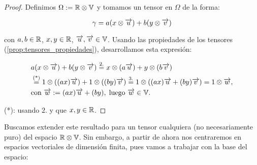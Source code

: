 \begin{proof}
	Definimos $\Omega := \mathbb{R} \otimes \mathbb{V}$ y tomamos un tensor en $\Omega$ de la forma:

	\begin{equation}
		\gamma = a(x \otimes \overrightarrow{u}) + b(y \otimes \overrightarrow{v})
	\end{equation}

	con $a, b \in \mathbb{R}$, $x, y \in \mathbb{R}$, $\overrightarrow{u}, \overrightarrow{v} \in \mathbb{V}$. Usando las propiedades de los tensores (\ref{prop:tensores_propiedades}), desarrollamos esta expresión:

	\begin{equation}
		\begin{split}
			& a(x \otimes \overrightarrow{u}) + b(y \otimes \overrightarrow{v}) \stackrel{\text{2.}}{=} x \otimes (a\overrightarrow{u}) + y \otimes (b\overrightarrow{v}) \\
			& \stackrel{\text{(*)}}{=} 1 \otimes ((ax) \overrightarrow{u}) + 1 \otimes ((by) \overrightarrow{v}) \stackrel{\text{3.}}{=} 1 \otimes ((ax)\overrightarrow{u} + (by) \overrightarrow{v}) = 1 \otimes \overrightarrow{w}, \\
			&\text{con } \overrightarrow{w} := (ax)\overrightarrow{u} + (by), \; \text{luego } \overrightarrow{w} \in \mathbb{V}.
		\end{split}
	\end{equation}

	(*): usando $2.$ y que $x, y \in \mathbb{R}$.


\end{proof}

Buscamos extender este resultado para un tensor cualquiera (no necesariamente puro) del espacio $\mathbb{R} \otimes \mathbb{V}$. Sin embargo, a partir de ahora nos centraremos en espacios vectoriales de dimensión finita, pues vamos a trabajar con la base del espacio:

